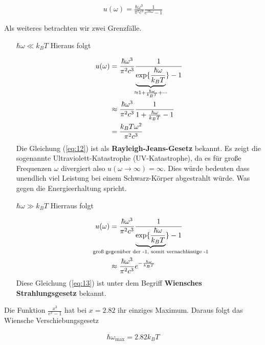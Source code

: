\begin{align}
  \label{eq:11}
  \boxed{    u(\omega) = \frac{\hbar  \omega^3}{\pi^2  c^3} \frac{1}{e^{\beta \hbar\omega}-1}   }
\end{align}

Als weiteres betrachten wir zwei Grenzfälle.

\begin{itemize}
\item[\(\hbar\omega\ll k_B T\)] Hieraus folgt


  \begin{align}
    \label{eq:12}
   u(\omega) &=  \frac{\hbar  \omega^3}{\pi^2  c^3} \frac{1}{\underbr{\exp\{\frac{\hbar\omega}{k_B T}}_{\approx 1+\frac{\hbar\omega}{k_B T}+\cdots} \}-1} \notag\\
&\approx  \frac{\hbar  \omega^3}{\pi^2  c^3} \frac{1}{  1 + \frac{\hbar\omega}{k_B T} -1} \notag\\
&=  \frac{k_B T \omega^2}{\pi^2  c^3} \notag\\
  \end{align}
Die Gleichung (\ref{eq:12}) ist als \textbf{Rayleigh-Jeans-Gesetz} bekannt. Es zeigt die sogenannte Ultraviolett-Katastrophe (UV-Katastrophe), da es für große Frequenzen \(\omega\) divergiert also \(u(\omega\to \infty)= \infty\). Dies würde bedeuten dass unendlich viel Leistung bei einem Schwarz-Körper abgestrahlt würde. Was gegen die Energieerhaltung spricht.

\item[\(\hbar\omega \gg k_B T\)] Hierraus folgt

  \begin{align}
    \label{eq:13}
    u(\omega) &=  \frac{\hbar  \omega^3}{\pi^2  c^3} \frac{1}{\underbr{\exp\{\frac{\hbar\omega}{k_B T}}_{\text{groß gegenüber der -1, somit vernachlässige -1}} \}-1} \notag\\
 &\approx  \frac{\hbar  \omega^3}{\pi^2  c^3} e^{-\frac{\hbar\omega}{k_B T}} \notag\\
  \end{align}
Diese Gleichung (\ref{eq:13}) ist unter dem Begriff \textbf{Wiensches Strahlungsgesetz} bekannt. 
\end{itemize}

Die Funktion \(\frac{x^3}{e^x-1}\) hat bei \(x=2.82\) ihr einziges Maximum. Daraus folgt das Wiensche Verschiebungsgesetz

\begin{align}
  \label{eq:15}
  \hbar\omega_{\text{max}}  = 2.82 k_B T
\end{align}


